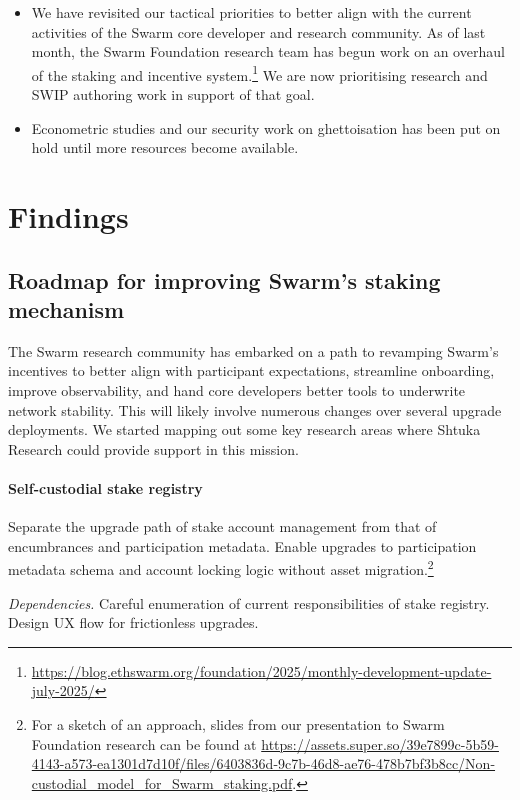 \begin{itemize}
  \item We have revisited our tactical priorities to better align with the current activities of the Swarm core developer and research community.
  As of last month, the Swarm Foundation research team has begun work on an overhaul of the staking and incentive system.\footnote{\url{https://blog.ethswarm.org/foundation/2025/monthly-development-update-july-2025/}}
  We are now prioritising research and SWIP authoring work in support of that goal.
  
  \item Econometric studies and our security work on ghettoisation has been put on hold until more resources become available.
\end{itemize}



\section*{Findings}

\subsection*{Roadmap for improving Swarm's staking mechanism}

The Swarm research community has embarked on a path to revamping Swarm's incentives to better align with participant expectations, streamline onboarding, improve observability, and hand core developers better tools to underwrite network stability.
%
This will likely involve numerous changes over several upgrade deployments.
%
We started mapping out some key research areas where Shtuka Research could provide support in this mission.

\paragraph{Self-custodial stake registry}
    Separate the upgrade path of stake account management from that of encumbrances and participation metadata.
    Enable upgrades to participation metadata schema and account locking logic without asset migration.\footnote{For a sketch of an approach, slides from our presentation to Swarm Foundation research can be found at \url{https://assets.super.so/39e7899c-5b59-4143-a573-ea1301d7d10f/files/6403836d-9c7b-46d8-ae76-478b7bf3b8cc/Non-custodial_model_for_Swarm_staking.pdf}.}

    \emph{Dependencies.}
    Careful enumeration of current responsibilities of stake registry.
    Design UX flow for frictionless upgrades.

